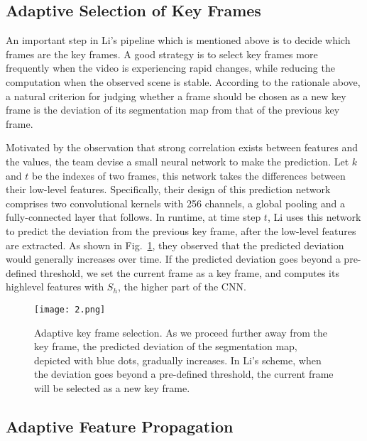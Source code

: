 \documentclass[10pt,twocolumn,letterpaper]{article}
\begin{document}
\subsection{Adaptive Selection of Key Frames}

An important step in Li's pipeline which is mentioned above is to decide which frames are the key frames. A good strategy is to select key frames more frequently when the video is experiencing rapid changes, while reducing the computation when the observed scene is stable. According to the rationale above, a natural criterion for judging whether a frame should be chosen as a new key frame is the deviation of its segmentation map from that of the previous key frame.

Motivated by the observation that strong correlation exists between features and the values, the team devise a small neural network to make the prediction. Let $k$ and $t$ be the indexes of two frames, this network takes the differences between their low-level features. Specifically, their design of this prediction network comprises two convolutional kernels with 256 channels, a global pooling and a fully-connected layer that follows. In runtime, at time step $t$, Li uses this network to predict the deviation from the previous key frame, after the low-level features are extracted. As shown in Fig.~\ref{fig:2}, they observed that the predicted deviation would generally increases over time. If the predicted deviation goes beyond a pre-defined threshold, we set the current frame as a key frame, and computes its highlevel features with $S_h$, the higher part of the CNN.
\begin{figure}
	\begin{center}
		\texttt{[image: 2.png]}
	\end{center}
	\caption{Adaptive key frame selection. As we proceed further away from the key frame, the predicted deviation of the segmentation map, depicted with blue dots, gradually increases. In Li's scheme, when the deviation goes beyond a pre-defined threshold, the current frame will be selected as a new key frame.}
	\label{fig:2}
\end{figure}

\subsection{Adaptive Feature Propagation}
\end{document}
